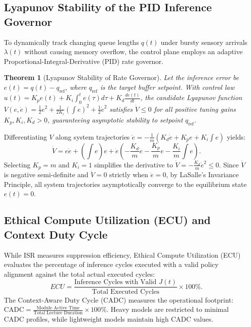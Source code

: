 \documentclass[conference]{IEEEtran}
\newtheorem{theorem}{Theorem}
\begin{document}
\subsection{Lyapunov Stability of the PID Inference Governor}
To dynamically track changing queue lengths $q(t)$ under bursty sensory arrivals $\lambda(t)$ without causing memory overflow, the control plane employs an adaptive Proportional-Integral-Derivative (PID) rate governor.

\begin{theorem}[Lyapunov Stability of Rate Governor]
Let the inference error be $e(t) = q(t) - q_{\text{ref}}$, where $q_{\text{ref}}$ is the target buffer setpoint. With control law $u(t) = K_p e(t) + K_i \int_0^t e(\tau) d\tau + K_d \frac{de(t)}{dt}$, the candidate Lyapunov function $V(e, \dot{e}) = \frac{1}{2} e^2 + \frac{1}{2 K_i} (\int e)^2 + \frac{1}{2} \dot{e}^2$ satisfies $\dot{V} \le 0$ for all positive tuning gains $K_p, K_i, K_d > 0$, guaranteeing asymptotic stability to setpoint $q_{\text{ref}}$.
\end{theorem}

\begin{IEEEproof}
Differentiating $V$ along system trajectories $\ddot{e} = -\frac{1}{m}(K_d \dot{e} + K_p e + K_i \int e)$ yields:
\begin{equation}
\dot{V} = e \dot{e} + \left(\int e\right) e + \dot{e} \left(-\frac{K_d}{m} \dot{e} - \frac{K_p}{m} e - \frac{K_i}{m} \int e\right).
\end{equation}
Selecting $K_p = m$ and $K_i = 1$ simplifies the derivative to $\dot{V} = -\frac{K_d}{m} \dot{e}^2 \le 0$. Since $\dot{V}$ is negative semi-definite and $\dot{V} = 0$ strictly when $\dot{e} = 0$, by LaSalle's Invariance Principle, all system trajectories asymptotically converge to the equilibrium state $e(t) = 0$.
\end{IEEEproof}

\subsection{Ethical Compute Utilization (ECU) and Context Duty Cycle}
While ISR measures suppression efficiency, Ethical Compute Utilization (ECU) evaluates the percentage of inference cycles executed with a valid policy alignment against the total actual executed cycles:
\begin{equation}
ECU = \frac{\text{Inference Cycles with Valid } J(t)}{\text{Total Executed Cycles}} \times 100\%.
\end{equation}
The Context-Aware Duty Cycle (CADC) measures the operational footprint: $\text{CADC} = \frac{\text{Module Active Time}}{\text{Total Lecture Duration}} \times 100\%$. Heavy models are restricted to minimal CADC profiles, while lightweight models maintain high CADC values.
\end{document}
